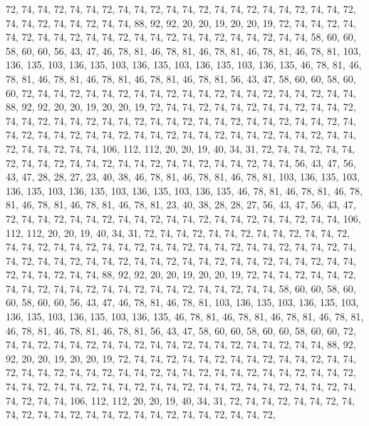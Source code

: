 72, 74, 74, 72, 74, 74, 72, 74, 74, 72, 74, 74, 72, 74, 74, 72, 74, 74, 72, 74, 74, 72, 74, 74, 72, 74, 74, 72, 74, 74, 88, 92, 92, 20, 20, 19, 20, 20, 19, 72, 74, 74, 72, 74, 74, 72, 74, 74, 72, 74, 74, 72, 74, 74, 72, 74, 74, 72, 74, 74, 72, 74, 74, 58,
60, 60, 58, 60, 60, 56, 43, 47, 46, 78, 81, 46, 78, 81, 46, 78, 81, 46, 78, 81, 46, 78, 81, 103, 136, 135, 103, 136, 135, 103, 136, 135, 103, 136, 135, 103, 136, 135, 46, 78, 81, 46, 78, 81, 46, 78, 81, 46, 78, 81, 46, 78, 81, 46, 78, 81, 56, 43, 47, 58, 60, 60, 58, 60,
60, 72, 74, 74, 72, 74, 74, 72, 74, 74, 72, 74, 74, 72, 74, 74, 72, 74, 74, 72, 74, 74, 88, 92, 92, 20, 20, 19, 20, 20, 19, 72, 74, 74, 72, 74, 74, 72, 74, 74, 72, 74, 74, 72, 74, 74, 72, 74, 74, 72, 74, 74, 72, 74, 74, 72, 74, 74, 72, 74, 74, 72, 74, 74,
72, 74, 74, 72, 74, 74, 72, 74, 74, 72, 74, 74, 72, 74, 74, 72, 74, 74, 72, 74, 74, 72, 74, 74, 72, 74, 74, 72, 74, 74, 106, 112, 112, 20, 20, 19, 40, 34, 31, 72, 74, 74, 72, 74, 74, 72, 74, 74, 72, 74, 74, 72, 74, 74, 72, 74, 74, 72, 74, 74, 72, 74, 74, 56,
43, 47, 56, 43, 47, 28, 28, 27, 23, 40, 38, 46, 78, 81, 46, 78, 81, 46, 78, 81, 103, 136, 135, 103, 136, 135, 103, 136, 135, 103, 136, 135, 103, 136, 135, 46, 78, 81, 46, 78, 81, 46, 78, 81, 46, 78, 81, 46, 78, 81, 46, 78, 81, 23, 40, 38, 28, 28, 27, 56, 43, 47, 56, 43,
47, 72, 74, 74, 72, 74, 74, 72, 74, 74, 72, 74, 74, 72, 74, 74, 72, 74, 74, 72, 74, 74, 106, 112, 112, 20, 20, 19, 40, 34, 31, 72, 74, 74, 72, 74, 74, 72, 74, 74, 72, 74, 74, 72, 74, 74, 72, 74, 74, 72, 74, 74, 72, 74, 74, 72, 74, 74, 72, 74, 74, 72, 74, 74,
72, 74, 74, 72, 74, 74, 72, 74, 74, 72, 74, 74, 72, 74, 74, 72, 74, 74, 72, 74, 74, 72, 74, 74, 72, 74, 74, 72, 74, 74, 88, 92, 92, 20, 20, 19, 20, 20, 19, 72, 74, 74, 72, 74, 74, 72, 74, 74, 72, 74, 74, 72, 74, 74, 72, 74, 74, 72, 74, 74, 72, 74, 74, 58,
60, 60, 58, 60, 60, 58, 60, 60, 56, 43, 47, 46, 78, 81, 46, 78, 81, 103, 136, 135, 103, 136, 135, 103, 136, 135, 103, 136, 135, 103, 136, 135, 46, 78, 81, 46, 78, 81, 46, 78, 81, 46, 78, 81, 46, 78, 81, 46, 78, 81, 46, 78, 81, 56, 43, 47, 58, 60, 60, 58, 60, 60, 58, 60,
60, 72, 74, 74, 72, 74, 74, 72, 74, 74, 72, 74, 74, 72, 74, 74, 72, 74, 74, 72, 74, 74, 88, 92, 92, 20, 20, 19, 20, 20, 19, 72, 74, 74, 72, 74, 74, 72, 74, 74, 72, 74, 74, 72, 74, 74, 72, 74, 74, 72, 74, 74, 72, 74, 74, 72, 74, 74, 72, 74, 74, 72, 74, 74,
72, 74, 74, 72, 74, 74, 72, 74, 74, 72, 74, 74, 72, 74, 74, 72, 74, 74, 72, 74, 74, 72, 74, 74, 72, 74, 74, 72, 74, 74, 106, 112, 112, 20, 20, 19, 40, 34, 31, 72, 74, 74, 72, 74, 74, 72, 74, 74, 72, 74, 74, 72, 74, 74, 72, 74, 74, 72, 74, 74, 72, 74, 74, 72,
